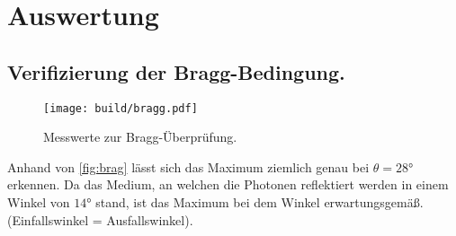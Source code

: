 \section{Auswertung}
\label{sec:Auswertung}

\subsection{Verifizierung der Bragg-Bedingung.}
\begin{figure}
    \centering
    \caption{Messwerte zur Bragg-Überprüfung.}
    \label{fig:brag}
    \texttt{[image: build/bragg.pdf]}
\end{figure}
\noindent Anhand von \autoref{fig:brag} lässt sich das Maximum ziemlich genau bei 
$\theta = 28\unit{\degree}$ erkennen. Da das Medium, an welchen 
die Photonen reflektiert werden in einem Winkel von $14\unit{\degree}$ stand, 
ist das Maximum bei dem Winkel erwartungsgemäß. (Einfallswinkel = Ausfallswinkel).

